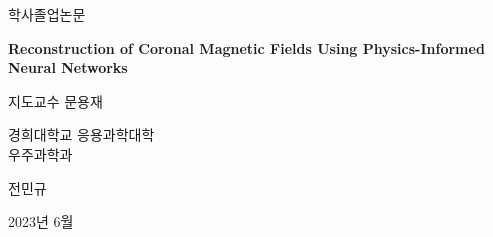 \begin{titlepage}
    \begin{center}
        \vspace*{1cm}
        
        \LARGE
        학사졸업논문

        \vspace{2cm}
        
        \huge
        \textbf{Reconstruction of Coronal Magnetic Fields Using Physics-Informed Neural Networks}
            
        \vspace{2cm}
        
        \LARGE
        지도교수 문용재
            
        \vspace{5cm}
            
        \huge
        경희대학교 응용과학대학\\
        우주과학과\\
            
        \vspace{1.5cm}

        \LARGE 전민규

        \vspace{2cm}

        2023년 6월
                        
        

    \end{center}
\end{titlepage}